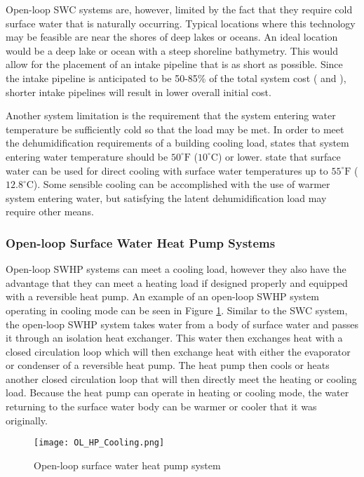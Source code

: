 Open-loop SWC systems are, however, limited by the fact that they require cold surface water that is naturally occurring. Typical locations where this technology may be feasible are near the shores of deep lakes or oceans. An ideal location would be a deep lake or ocean with a steep shoreline bathymetry. This would allow for the placement of an intake pipeline that is as short as possible. Since the intake pipeline is anticipated to be 50-85\% of the total system cost (\cite{Ciani1978} and \cite{LeraandVanRyzin1995}), shorter intake pipelines will result in lower overall initial cost. 

Another system limitation is the requirement that the system entering water temperature be sufficiently cold so that the load may be met. In order to meet the dehumidification requirements of a building cooling load, \cite{Ciani1978} states that system entering water temperature should be $50^\circ \mbox{F}$ ($10^\circ \mbox{C}$) or lower. \cite{KavanaughPezent1990} state that surface water can be used for direct cooling with surface water temperatures up to $55^\circ \mbox{F}$ ($12.8^\circ \mbox{C}$).  Some sensible cooling can be accomplished with the use of warmer system entering water, but satisfying the latent dehumidification load may require other means.

		\subsubsection{Open-loop Surface Water Heat Pump Systems}

Open-loop SWHP systems can meet a cooling load, however they also have the advantage that they can meet a heating load if designed properly and equipped with a reversible heat pump. An example of an open-loop SWHP system operating in cooling mode can be seen in Figure \ref{fig:Intro:SystemOverview:OpenLoop:OLHeatPumpCooling}. Similar to the SWC system, the open-loop SWHP system takes water from a body of surface water and passes it through an isolation heat exchanger. This water then exchanges heat with a closed circulation loop which will then exchange heat with either the evaporator or condenser of a reversible heat pump. The heat pump then cools or heats another closed circulation loop that will then directly meet the heating or cooling load. Because the heat pump can operate in heating or cooling mode, the water returning to the surface water body can be warmer or cooler that it was originally.

	\begin{figure}
		\centering
		\texttt{[image: OL\_HP\_Cooling.png]}
		\caption[Open-loop surface water heat pump system]{Open-loop surface water heat pump system}
		\label{fig:Intro:SystemOverview:OpenLoop:OLHeatPumpCooling}
	\end{figure}

